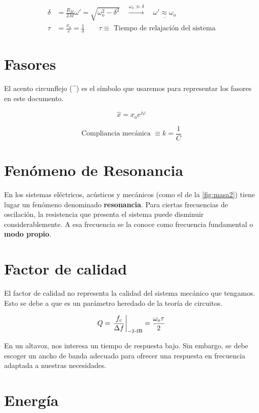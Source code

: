 \documentclass[a4paper]{book}
\begin{document}
\begin{align*}
	\delta & = \frac{R_M}{2M}
	\omega ' = \sqrt{\omega _o^2 - \delta ^2} \quad \xrightarrow{\omega _o \gg \delta} \quad \underline{\omega ' \approx \omega_o} \\[5pt]
	\tau   & = \frac{x_o}{e} = \frac{1}{\delta} \qquad \tau \equiv \textrm{ Tiempo de relajación del sistema}
\end{align*}

\section{Fasores}

El acento circunflejo ($\hat{\phantom{x}}$) es el símbolo que usaremos para representar los fasores en este documento.

\[ \hat{x} = x_o e^{j\varphi} \]

\[ \textrm{Compliancia mecánica }\equiv k = \frac{1}{C} \]

\section{Fenómeno de Resonancia}

En los sistemas eléctricos, acústicos y mecánicos (como el de la \autoref{fig:masa2}) tiene lugar un fenómeno denominado \textbf{resonancia}. Para ciertas frecuencias de oscilación, la resistencia que presenta el sistema puede disminuir considerablemente. A esa frecuencia se la conoce como frecuencia fundamental o \textbf{modo propio}.

\section{Factor de calidad}

El factor de calidad no representa la calidad del sistema mecánico que tengamos. Esto se debe a que es un parámetro heredado de la teoría de circuitos.

\[ Q = \left. \frac{f_c}{\Delta f } \right\rvert _{-3\operatorname{dB}} = \frac{\omega_o \tau}{2}\]

En un altavoz, nos interesa un tiempo de respuesta bajo. Sin embargo, se debe escoger un ancho de banda adecuado para ofrecer una respuesta en frecuencia adaptada a nuestras necesidades.

\section{Energía}
\end{document}
